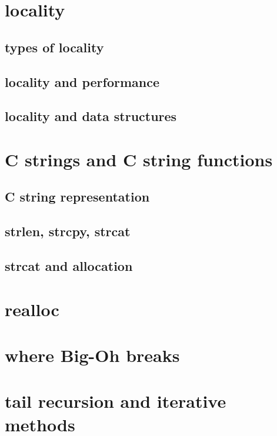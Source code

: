 

\section{locality}

\subsection{types of locality}

\subsection{locality and performance}

\subsection{locality and data structures}


\section{C strings and C string functions}

\subsection{C string representation}

\subsection{strlen, strcpy, strcat}

\subsection{strcat and allocation}

\section{realloc}

\section{where Big-Oh breaks}

\section{tail recursion and iterative methods}


